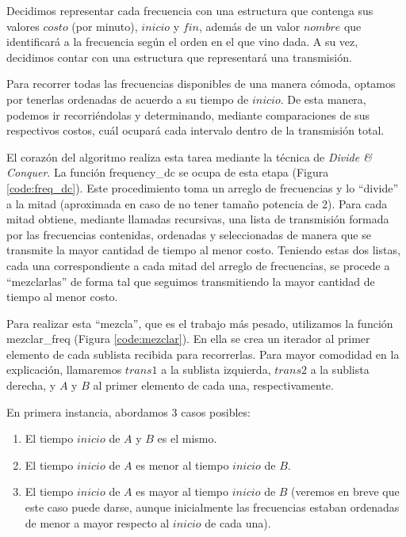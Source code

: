 Decidimos representar cada frecuencia con una estructura que contenga sus valores $costo$ (por minuto), $inicio$ y $fin$, además de un valor $nombre$ que identificará a la frecuencia según el orden en el que vino dada.  A su vez, decidimos contar con una estructura que representará una transmisión.

Para recorrer todas las frecuencias disponibles de una manera cómoda, optamos por tenerlas ordenadas de acuerdo  a su tiempo de $inicio$.  De esta manera, podemos ir recorriéndolas y determinando, mediante comparaciones de sus respectivos costos, cuál ocupará cada intervalo dentro de la transmisión total.

El corazón del algoritmo realiza esta tarea mediante la técnica de {\it Divide \& Conquer}.  La función {\sc frequency_dc} se ocupa de esta etapa (Figura \ref{code:freq_dc}).  Este procedimiento toma un arreglo de frecuencias y lo ``divide'' a la mitad (aproximada en caso de no tener tamaño potencia de 2).  Para cada mitad obtiene, mediante llamadas recursivas, una lista de transmisión formada por las frecuencias contenidas, ordenadas y seleccionadas de manera que se transmite la mayor cantidad de tiempo al menor costo.  Teniendo estas dos listas, cada una correspondiente a cada mitad del arreglo de frecuencias, se procede a ``mezclarlas'' de forma tal que seguimos transmitiendo la mayor cantidad de tiempo al menor costo.

Para realizar esta ``mezcla'', que es el trabajo más pesado, utilizamos la función {\sc mezclar_freq} (Figura \ref{code:mezclar}). En ella se crea un iterador al primer elemento de cada sublista recibida para recorrerlas.  Para mayor comodidad en la explicación, llamaremos $trans1$ a la sublista izquierda, $trans2$ a la sublista derecha, y $A$ y $B$ al primer elemento de cada una, respectivamente.

En primera instancia, abordamos 3 casos posibles: 

\begin{enumerate}
\item El tiempo $inicio$ de $A$ y $B$ es el mismo.
\item El tiempo $inicio$ de $A$ es menor al tiempo $inicio$ de $B$.
\item El tiempo $inicio$ de $A$ es mayor al tiempo $inicio$ de $B$ (veremos en breve que este caso puede darse, aunque inicialmente las frecuencias estaban ordenadas de menor a mayor respecto al $inicio$ de cada una).
\end{enumerate}

